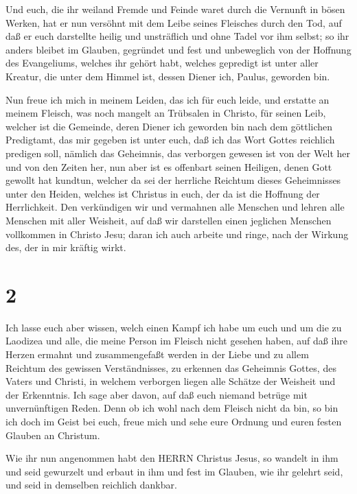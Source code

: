  Und euch, die ihr weiland Fremde und Feinde waret durch
die Vernunft in bösen Werken,  hat er nun versöhnt mit dem
Leibe seines Fleisches durch den Tod, auf daß er euch darstellte heilig
und unsträflich und ohne Tadel vor ihm selbst;  so ihr
anders bleibet im Glauben, gegründet und fest und unbeweglich von der
Hoffnung des Evangeliums, welches ihr gehört habt, welches gepredigt ist
unter aller Kreatur, die unter dem Himmel ist, dessen Diener ich,
Paulus, geworden bin.

 Nun freue ich mich in meinem Leiden, das ich für euch
leide, und erstatte an meinem Fleisch, was noch mangelt an Trübsalen in
Christo, für seinen Leib, welcher ist die Gemeinde,  deren
Diener ich geworden bin nach dem göttlichen Predigtamt, das mir gegeben
ist unter euch, daß ich das Wort Gottes reichlich predigen soll,
 nämlich das Geheimnis, das verborgen gewesen ist von der
Welt her und von den Zeiten her, nun aber ist es offenbart seinen
Heiligen,  denen Gott gewollt hat kundtun, welcher da sei
der herrliche Reichtum dieses Geheimnisses unter den Heiden, welches ist
Christus in euch, der da ist die Hoffnung der Herrlichkeit.
 Den verkündigen wir und vermahnen alle Menschen und lehren
alle Menschen mit aller Weisheit, auf daß wir darstellen einen jeglichen
Menschen vollkommen in Christo Jesu;  daran ich auch
arbeite und ringe, nach der Wirkung des, der in mir kräftig wirkt.

\hypertarget{section-1}{%
\section{2}\label{section-1}}

 Ich lasse euch aber wissen, welch einen Kampf ich habe um
euch und um die zu Laodizea und alle, die meine Person im Fleisch nicht
gesehen haben,  auf daß ihre Herzen ermahnt und
zusammengefaßt werden in der Liebe und zu allem Reichtum des gewissen
Verständnisses, zu erkennen das Geheimnis Gottes, des Vaters und
Christi,  in welchem verborgen liegen alle Schätze der
Weisheit und der Erkenntnis.  Ich sage aber davon, auf daß
euch niemand betrüge mit unvernünftigen Reden.  Denn ob ich
wohl nach dem Fleisch nicht da bin, so bin ich doch im Geist bei euch,
freue mich und sehe eure Ordnung und euren festen Glauben an Christum.

 Wie ihr nun angenommen habt den HERRN Christus Jesus, so
wandelt in ihm  und seid gewurzelt und erbaut in ihm und
fest im Glauben, wie ihr gelehrt seid, und seid in demselben reichlich
dankbar.

